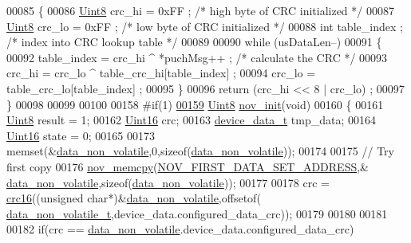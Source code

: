 \begin{DoxyCode}
00085 \{
00086     \hyperlink{a00072_af84840501dec18061d18a68c162a8fa2}{Uint8} crc\_hi = 0xFF ;        \textcolor{comment}{/* high byte of CRC initialized */}
00087     \hyperlink{a00072_af84840501dec18061d18a68c162a8fa2}{Uint8} crc\_lo = 0xFF ;        \textcolor{comment}{/* low byte of CRC initialized */}
00088     \textcolor{keywordtype}{int} table\_index ;            \textcolor{comment}{/* index into CRC lookup table */}
00089     
00090     \textcolor{keywordflow}{while} (usDataLen--)
00091     \{
00092         table\_index = crc\_hi ^ *puchMsg++ ;            \textcolor{comment}{/* calculate the CRC */}
00093         crc\_hi = crc\_lo ^ table\_crc\_hi[table\_index] ;
00094         crc\_lo = table\_crc\_lo[table\_index] ;
00095     \}
00096     \textcolor{keywordflow}{return} (crc\_hi << 8 | crc\_lo) ;
00097 \}
00098 
00099 
00100 
00158 \textcolor{preprocessor}{#if(1)}
\hypertarget{a00060_source_l00159}{}\hyperlink{a00060_a8ad2f815848f1668763c01ff9d45a01b}{00159} \hyperlink{a00072_af84840501dec18061d18a68c162a8fa2}{Uint8} \hyperlink{a00060_a8ad2f815848f1668763c01ff9d45a01b}{nov\_init}(\textcolor{keywordtype}{void})
00160 \{
00161     \hyperlink{a00072_af84840501dec18061d18a68c162a8fa2}{Uint8}                result = 1;
00162     \hyperlink{a00072_a59a9f6be4562c327cbfb4f7e8e18f08b}{Uint16}               crc;
00163     \hyperlink{a00022_a95029dff9c90f6a6907353ba86eb3f33}{device\_data\_t}        tmp\_data;
00164     \hyperlink{a00072_a59a9f6be4562c327cbfb4f7e8e18f08b}{Uint16}               state = 0;
00165 
00173     memset(&\hyperlink{a00060_a76ac5f917f5308dcd83de0d7c94559fb}{data\_non\_volatile},0,\textcolor{keyword}{sizeof}(\hyperlink{a00060_a76ac5f917f5308dcd83de0d7c94559fb}{data\_non\_volatile}));
00174 
00175     \textcolor{comment}{// Try first copy}
00176     \hyperlink{a00060_a3ff681f3af83ec441535611dac6ada16}{nov\_memcpy}(\hyperlink{a00029_a3d5917eef9709c44acd2e6314619f440}{NOV\_FIRST\_DATA\_SET\_ADDRESS},&
      \hyperlink{a00060_a76ac5f917f5308dcd83de0d7c94559fb}{data\_non\_volatile},\textcolor{keyword}{sizeof}(\hyperlink{a00060_a76ac5f917f5308dcd83de0d7c94559fb}{data\_non\_volatile}));
00177 
00178     crc = \hyperlink{a00060_a6553827687db2137ee550ad6e1d2f316}{crc16}((\textcolor{keywordtype}{unsigned} \textcolor{keywordtype}{char}*)&\hyperlink{a00060_a76ac5f917f5308dcd83de0d7c94559fb}{data\_non\_volatile},offsetof(
      \hyperlink{a00022_a8e66478e65e03ebc9434466e51c0ad0b}{data\_non\_volatile\_t},device\_data.configured\_data\_crc));
00179 
00180 
00181 
00182     \textcolor{keywordflow}{if}(crc == \hyperlink{a00060_a76ac5f917f5308dcd83de0d7c94559fb}{data\_non\_volatile}.device\_data.configured\_data\_crc)

\end{DoxyCode}
